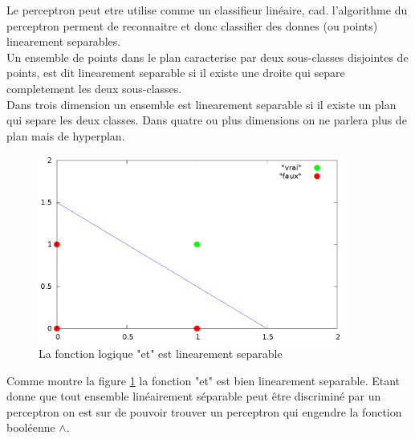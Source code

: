 \documentclass[twoside,openright,a4paper,11pt,french]{article}
\begin{document}
Le perceptron peut etre utilise comme un classifieur linéaire, cad. l'algorithme du
perceptron perment de reconnaitre et donc classifier des donnes (ou points)
linearement separables.\\

Un ensemble de points dans le plan caracterise par deux sous-classes disjointes
de points, est dit linearement separable si il existe une droite qui separe
completement les deux sous-classes.\\

Dans trois dimension un ensemble est linearement separable si il existe un plan
qui separe les deux classes. Dans quatre ou plus dimensions on ne parlera plus de
plan mais de hyperplan.


\begin{figure}[h]
\centering
\includegraphics[width=10cm]{./pics/and/and.eps}
\caption{La fonction logique "et" est linearement separable}
\label{fig:and}
\end{figure}


Comme montre la figure \ref{fig:and} la fonction "et" est bien linearement
separable.  Etant donne que tout ensemble linéairement séparable peut être
discriminé par un perceptron on est sur de pouvoir trouver un perceptron qui
engendre la fonction booléenne $\land$.













\end{document}
